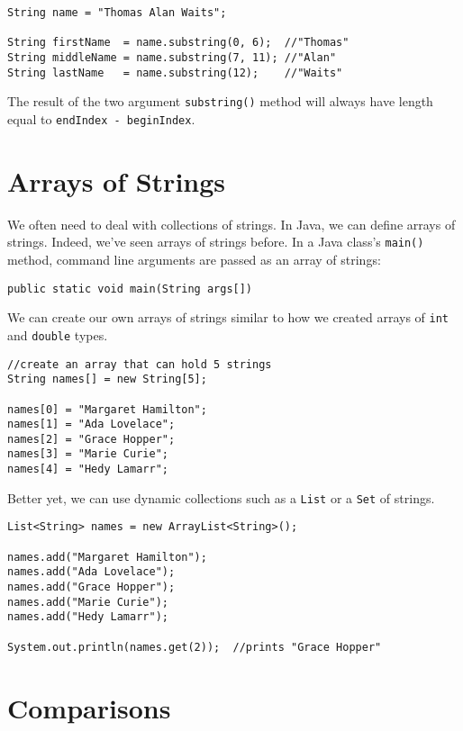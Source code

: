 \begin{verbatim}
String name = "Thomas Alan Waits";

String firstName  = name.substring(0, 6);  //"Thomas"
String middleName = name.substring(7, 11); //"Alan"
String lastName   = name.substring(12);    //"Waits"
\end{verbatim}

The result of the two argument \texttt{substring()}
method will always have length equal to \texttt{endIndex - beginIndex}.

\section{Arrays of Strings}

We often need to deal with collections of strings.  In 
Java, we can define arrays of strings.  Indeed, we've seen 
arrays of strings before.  In a Java class's 
\texttt{main()} method, 
command line arguments are passed as an array of strings:

\texttt{public static void main(String args[])}

We can create our own arrays of strings similar to
how we created arrays of \texttt{int}
and \texttt{double} types.

\begin{verbatim}
//create an array that can hold 5 strings
String names[] = new String[5];

names[0] = "Margaret Hamilton";
names[1] = "Ada Lovelace";
names[2] = "Grace Hopper";
names[3] = "Marie Curie";
names[4] = "Hedy Lamarr";
\end{verbatim}

Better yet, we can use dynamic collections such as
a \texttt{List} or a \texttt{Set} 
of strings.  

\begin{verbatim}
List<String> names = new ArrayList<String>();

names.add("Margaret Hamilton");
names.add("Ada Lovelace");
names.add("Grace Hopper");
names.add("Marie Curie");
names.add("Hedy Lamarr");

System.out.println(names.get(2));  //prints "Grace Hopper"
\end{verbatim}

\section{Comparisons}

